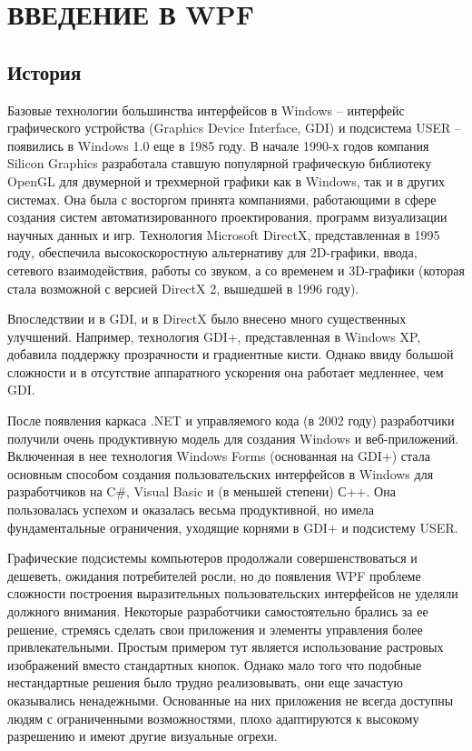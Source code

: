 \documentclass[a4paper,14pt]{extarticle}
\begin{document}
\section{ВВЕДЕНИЕ В WPF}
\subsection{История}
Базовые технологии большинства интерфейсов в Windows – интерфейс графического
устройства (Graphics Device Interface, GDI) и подсистема USER – появились
в Windows 1.0 еще в 1985 году. В начале 1990-х годов компания Silicon
Graphics разработала ставшую популярной графическую библиотеку OpenGL
для двумерной и трехмерной графики как в Windows, так и в других системах.
Она была с восторгом принята компаниями, работающими в сфере создания
систем автоматизированного проектирования, программ визуализации научных данных и игр.
Технология Microsoft DirectX, представленная в 1995 году, обеспечила высокоскоростную
альтернативу для 2D-графики, ввода, сетевого взаимодействия, работы со звуком, а со
временем и 3D-графики (которая стала возможной с версией DirectX 2, вышедшей в 1996 году).

Впоследствии и в GDI, и в DirectX было внесено много существенных улучшений. Например,
технология GDI+, представленная в Windows XP, добавила поддержку прозрачности и
градиентные кисти. Однако ввиду большой сложности и в отсутствие аппаратного ускорения
она работает медленнее, чем GDI. 

После появления каркаса .NET и управляемого кода (в 2002 году) разработчики получили
очень продуктивную модель для создания Windows и веб-приложений. Включенная в нее
технология Windows Forms (основанная на GDI+) стала основным способом создания
пользовательских интерфейсов в Windows для разработчиков на C\#, Visual Basic
и (в меньшей степени) С++. Она пользовалась успехом и оказалась весьма продуктивной,
но имела фундаментальные ограничения, уходящие корнями в GDI+ и подсистему USER.

Графические подсистемы компьютеров продолжали совершенствоваться и дешеветь, ожидания
потребителей росли, но до появления WPF проблеме сложности построения выразительных
пользовательских интерфейсов не уделяли должного внимания. Некоторые разработчики
самостоятельно брались за ее решение, стремясь сделать свои приложения и элементы управления
более привлекательными. Простым примером тут является использование растровых изображений
вместо стандартных кнопок. Однако мало того что подобные нестандартные решения было трудно
реализовывать, они еще зачастую оказывались ненадежными. Основанные на них приложения не
всегда доступны людям с ограниченными возможностями, плохо адаптируются к высокому разрешению
и имеют другие визуальные огрехи.
\end{document}
